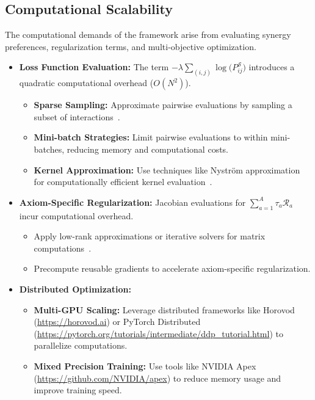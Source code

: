 \subsection{Computational Scalability}
The computational demands of the framework arise from evaluating synergy preferences, regularization terms, and multi-objective optimization.

\begin{itemize}
    \item \textbf{Loss Function Evaluation:}
    The term \(-\lambda \sum_{(i,j)} \log\bigl(P_{ij}^{\mathcal{S}}\bigr)\) introduces a quadratic computational overhead (\(O(N^2)\)).
    \begin{itemize}
        \item \textbf{Sparse Sampling:} Approximate pairwise evaluations by sampling a subset of interactions~\cite{johnson2019billion}.
        \item \textbf{Mini-batch Strategies:} Limit pairwise evaluations to within mini-batches, reducing memory and computational costs.
        \item \textbf{Kernel Approximation:} Use techniques like Nyström approximation for computationally efficient kernel evaluation~\cite{williams2001using}.
    \end{itemize}
    
    \item \textbf{Axiom-Specific Regularization:}
    Jacobian evaluations for \(\sum_{a=1}^A \tau_a \mathcal{R}_a\) incur computational overhead.
    \begin{itemize}
        \item Apply low-rank approximations or iterative solvers for matrix computations~\cite{saad2003iterative}.
        \item Precompute reusable gradients to accelerate axiom-specific regularization.
    \end{itemize}
    
    \item \textbf{Distributed Optimization:}
    \begin{itemize}
        \item \textbf{Multi-GPU Scaling:} Leverage distributed frameworks like Horovod (\url{https://horovod.ai}) or PyTorch Distributed (\url{https://pytorch.org/tutorials/intermediate/ddp_tutorial.html}) to parallelize computations.
        \item \textbf{Mixed Precision Training:} Use tools like NVIDIA Apex (\url{https://github.com/NVIDIA/apex}) to reduce memory usage and improve training speed.
    \end{itemize}
\end{itemize}

